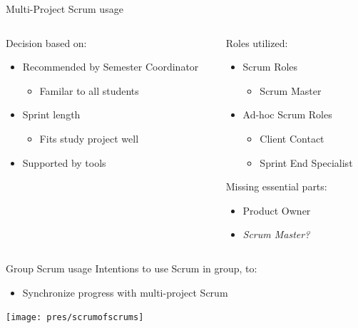 \begin{frame}{Multi-Project Scrum usage}
  \begin{columns}
  		\begin{column}{0.5\textwidth}
  			Decision based on:
  			\begin{itemize}
      		\item Recommended by Semester Coordinator
        		\begin{itemize}
        		\item Familar to all students
        		\end{itemize}
      		\item Sprint length
        		\begin{itemize}
        		\item Fits study project well
        		\end{itemize}
      		\item Supported by tools
        \end{itemize}
  		\end{column}
  		
  		\pause
  		
  		\begin{column}{0.5\textwidth}
        Roles utilized:	
  	    \begin{itemize}
      	  \item Scrum Roles
        	  \begin{itemize}
        	    \item Scrum Master
        	  \end{itemize}
      		\item Ad-hoc Scrum Roles
        		\begin{itemize}
  	      		\item Client Contact
  	      		\item Sprint End Specialist
        		\end{itemize}
      	\end{itemize}
      	\pause
  	    \linespace
  			Missing essential parts:
    				\begin{itemize}
    				\item Product Owner
    				\pause
    				\item \textit{Scrum Master?}
    				\end{itemize}
  		\end{column}
  \end{columns}
\end{frame}

\begin{frame}{Group Scrum usage}
	Intentions to use Scrum in group, to:
	\begin{itemize}
		\item Synchronize progress with multi-project Scrum
	\end{itemize}
	\begin{center}
	\texttt{[image: pres/scrumofscrums]}
	\end{center}
\end{frame}

